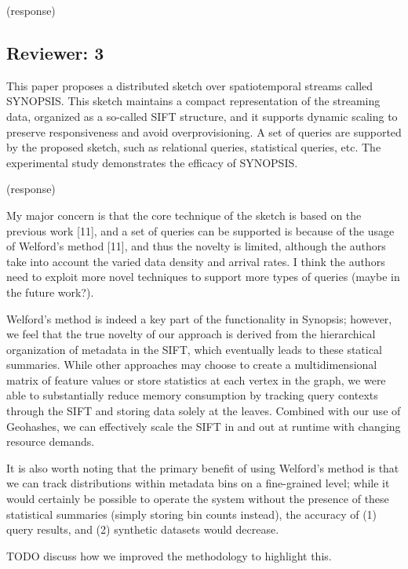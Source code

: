 \documentclass{article}
\begin{document}
\begin{tcolorbox}
(response)
\end{tcolorbox}

\subsection*{Reviewer: 3}\label{reviewer-3}

This paper proposes a distributed sketch over spatiotemporal streams
called SYNOPSIS. This sketch maintains a compact representation of the
streaming data, organized as a so-called SIFT structure, and it supports
dynamic scaling to preserve responsiveness and avoid overprovisioning. A
set of queries are supported by the proposed sketch, such as relational
queries, statistical queries, etc. The experimental study demonstrates
the efficacy of SYNOPSIS.

\begin{tcolorbox}
(response)
\end{tcolorbox}

My major concern is that the core technique of the sketch is based on
the previous work {[}11{]}, and a set of queries can be supported is
because of the usage of Welford's method {[}11{]}, and thus the novelty
is limited, although the authors take into account the varied data
density and arrival rates. I think the authors need to exploit more
novel techniques to support more types of queries (maybe in the future
work?).

\begin{tcolorbox}
Welford's method is indeed a key part of the functionality in Synopsis;
however, we feel that the true novelty of our approach is derived from
the hierarchical organization of metadata in the SIFT, which eventually
leads to these statical summaries. While other approaches may choose to
create a multidimensional matrix of feature values or store statistics
at each vertex in the graph, we were able to substantially reduce memory
consumption by tracking query contexts through the SIFT and storing data
solely at the leaves. Combined with our use of Geohashes, we can
effectively scale the SIFT in and out at runtime with changing resource
demands.

It is also worth noting that the primary benefit of using Welford's
method is that we can track distributions within metadata bins on a
fine-grained level; while it would certainly be possible to operate the
system without the presence of these statistical summaries (simply
storing bin counts instead), the accuracy of (1) query results, and (2)
synthetic datasets would decrease.

TODO discuss how we improved the methodology to highlight this.
\end{tcolorbox}
\end{document}

